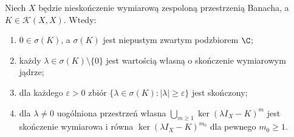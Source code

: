 \begin{twierdzenie}
\label{thm:riesz-schauder30}
Niech $X$ będzie nieskończenie wymiarową zespoloną
przestrzenią Banacha, a $K\in\mathcal K(X,X)$.
Wtedy:
\begin{enumerate}[label=\textup{(\roman*)}]
\item $0\in\sigma(K)$, a $\sigma(K)$ jest niepustym
zwartym podzbiorem $\C$;
\item każdy $\lambda\in\sigma(K)\setminus\{0\}$ jest
wartością własną o skończenie wymiarowym jądrze;
\item dla każdego $\varepsilon>0$ zbiór
$\{\lambda\in\sigma(K):|\lambda|\ge\varepsilon\}$
jest skończony;
\item dla $\lambda\ne0$ uogólniona przestrzeń własna
$\bigcup_{m\ge1}\ker(\lambda I_X-K)^m$ jest
skończenie wymiarowa i równa
$\ker(\lambda I_X-K)^{m_0}$ dla pewnego $m_0\ge1$.
\end{enumerate}
\end{twierdzenie}
